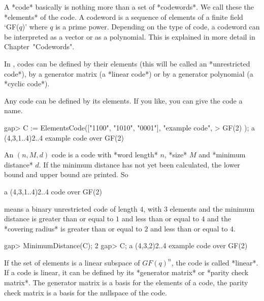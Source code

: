 %
%
%
%

A *code* basically is nothing  more than a   set of *codewords*. We  call
these the *elements* of the code. A codeword is a sequence of elements of
a finite field  `GF($q$)' where $q$ is  a  prime power. Depending  on the
type of code,  a   codeword can be interpreted  as   a  vector or  as   a
polynomial. This is explained in more detail in Chapter~"Codewords".

In {\GUAVA}, codes can be defined by their  elements (this will be called
an *unrestricted code*), by a generator matrix  (a *linear code*) or by a
generator polynomial (a *cyclic code*).

Any code can  be defined by  its elements. If  you like, you can give the
code a name.

\beginexample
gap> C := ElementsCode(["1100", "1010", "0001"], "example code",
>                      GF(2) );
a (4,3,1..4)2..4 example code over GF(2) 
\endexample

An $(n,M,d)$ code   is a code  with   *word length* $n$,  *size*  $M$ and
*minimum   distance* $d$.  If  the   minimum distance  has not  yet  been
calculated, the lower bound and upper bound are printed. So

\begintt
a (4,3,1..4)2..4 code over GF(2)
\endtt

means a binary unrestricted code of length $4$, with $3$ elements and the
minimum distance is greater than or equal to  $1$  and less than or equal
to $4$ and the *covering radius* is greater than or equal to $2$ and less
than or equal to $4$.

\beginexample
gap> MinimumDistance(C);
2
gap> C;
a (4,3,2)2..4 example code over GF(2) 
\endexample

If the set  of elements is a linear   subspace of $GF(q)^n$, the code  is
called *linear*. If a code is linear, it can be defined by its *generator
matrix* or *parity  check matrix*.  The generator  matrix is  a basis for
the elements   of a code,   the parity check  matrix is  a  basis for the
nullspace of the code.

